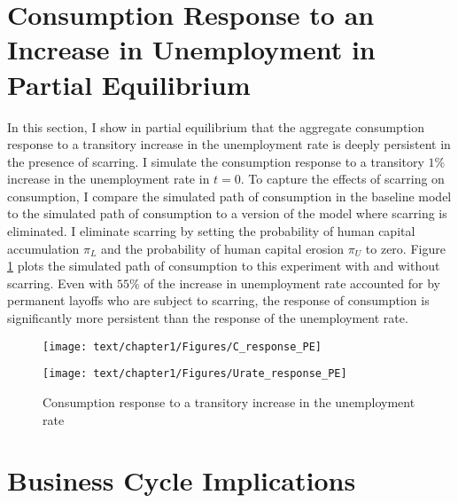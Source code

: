 
\section{Consumption Response to an Increase in Unemployment in Partial Equilibrium}

In this section, I show in partial equilibrium that the aggregate consumption response to a transitory increase in the unemployment rate is deeply persistent in the presence of scarring. I simulate the consumption response to a transitory $1\%$ increase in the unemployment rate in $t=0$. To capture the effects of scarring on consumption, I compare the simulated path of consumption in the baseline model to the simulated path of consumption to a version of the model where scarring is eliminated. I eliminate scarring by setting the probability of human capital accumulation $\pi_{L}$ and the probability of human capital erosion $\pi_{U}$ to zero. Figure \ref{Micro_results} plots the simulated path of consumption to this experiment with and without scarring. Even with $55\%$ of the increase in unemployment rate accounted for by permanent layoffs who are subject to scarring, the response of consumption is significantly more persistent than the response of the unemployment rate. 



\begin{figure}[H]
    \centering
   \begin{minipage}{0.49\textwidth}
        \centering
        \texttt{[image: text/chapter1/Figures/C\_response\_PE]} 
    \end{minipage}\hfill
    \begin{minipage}{0.49\textwidth}
        \centering
        \texttt{[image: text/chapter1/Figures/Urate\_response\_PE]}
    \end{minipage}
    \caption{Consumption response to a transitory increase in the unemployment rate}
    \label{Micro_results}
\end{figure}





\section{Business Cycle Implications}


